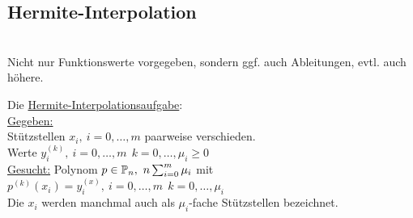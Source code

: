 \subsection{Hermite-Interpolation}\hfill\\
Nicht nur Funktionswerte vorgegeben, sondern ggf. auch Ableitungen, evtl. auch höhere.
\begin{definition}
    Die \underline{Hermite-Interpolationsaufgabe}:\\
    \underline{Gegeben:}\\ Stützstellen $x_i, \ i=0,\dots , m$ paarweise verschieden.\\
           \qquad Werte $y_i^{(k)}, \ i=0,\dots , m\ \ k=0,\dots, \mu_i \geq 0$\\
            
    \underline{Gesucht:} Polynom $p\in\Pol_n,\ n\sum_{i=0}^{m}\mu_i$ mit $p^{(k)}(x_i)=y_i^{(x)},\ i=0,\dots,m \ \ 
    k=0,\dots,\mu_i$\\
    Die $x_i$ werden manchmal auch als $\mu_i$-fache Stützstellen bezeichnet.
\end{definition}

